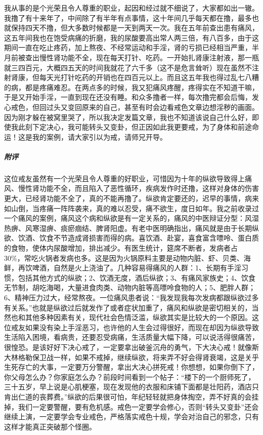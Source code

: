 \begin{case}
    我从事的是个光荣且令人尊重的职业，起因和经过就不细说了，大家都如出一辙。我撸了有十来年了，中间除了有半年有点事情，这十年间几乎每天都在撸，最多也就保持四天不撸，但大多数时候都是一天到两天一次。我在五年前查出患有痛风，这五年间我也在饱受病痛的折磨，我的尿酸要高出常人两三倍，有八百多，由于这期间一直在吃止疼药，加上熬夜、不经常运动和手淫，肾的亏损已经相当严重，半月前被查出慢性肾功能不全，现在每天打针、吃药。一开始扎肾康注射液，那一瓶就三四百元，大概四五天的时间我就花了六千多（这不是危言耸听）现在虽然不注射肾康，但每天光打针吃药的开销也在四百元以上。而且这五年我也得过乱七八糟的病，都是疼痛难忍。在两点多的时候，我又犯痛风疼醒，疼得实在不知道干嘛，于是又开始手淫，一直到现在还没有睡。和众多撸者一样，每次撸完都会后悔，发心戒色，但回过头又变回原来的自己，甚至有时会边看戒色文章边想淫秽的画面。因为刚才躲在被窝里哭了，所以我决定发篇文章，我也不知道该说自己什么好，即使我此刻下定决心，我可能转头又变卦，但正因如此我更要戒，为了身体和前途命运！这是我的案例，请大家引以为戒，请师兄开导。
    \subparagraph{附评} 这位戒友虽然有一个光荣且令人尊重的好职业，可惜因为十年的纵欲导致得上痛风、慢性肾功能不全，而且陷入了恶性循环，疾病发作时还撸，这样对身体的伤害更大，已经肾功能不全了，真的不能再撸了。纵欲肯定要还的，迟早的事情，病来如山倒，当疼痛一阵阵袭来，真的难以忍受，痛不欲生，度日如年。我之前收录过一个痛风的案例，痛风这个病和纵欲是有一定关系的，痛风的中医辩证分型：风湿热痹、风寒湿痹、痰瘀痼结、脾肾阳虚。有老中医明确指出，痛风就是由于长期纵欲、饮酒、饮食不节造成肾损害而得的病。喜饮酒、赴宴，喜食富含嘌呤、蛋白质的食物，使体内尿酸增加，排出减少。有医生统计，筵席不断者，发病者占 30\%，常吃火锅者发病也多。这是因为火锅原料主要是动物内脏、虾、贝类、海鲜，再饮啤酒，自然是火上浇油了。几种容易得痛风的人群：1、长期有手淫习惯，包括其他方式的纵欲；2、饮酒无度，酒后纵欲；3、有痛风家族史；4、饮食无节制，胡吃海喝，大量进食肉类、动物内脏等高嘌呤食物的人；5、肥胖人群；6、精神压力过大，经常熬夜。一位痛风患者说：“我发现我每次发病都跟纵欲过多有关系。”也就是纵欲过后就发作了或者症状加重了，痛风和纵欲是密切相关的，当然也和其他多种因素有关，现代社会色情泛滥，纵欲其实是比较大的一个原因。这位戒友如果没有染上手淫恶习，也许他的人生会过得很好，而现在却因为纵欲导致生活陷入困境，看病贵，还要忍受病痛，生活质量大幅下降，可以说活得很痛苦，很惶恐。是该好好下决心戒了，一定要拿出破釜沉舟的勇气，下大决心戒！就像斯大林格勒保卫战一样，如果不戒掉，继续纵欲，将来弄不好会得肾衰竭，这是关乎生死存亡的大事，一定要万分警醒，拿出大决心拼死戒！你想想，如果你倒下了，你父母怎么办？你家庭怎么办？前段时间看到一个帖子：“楼下的一个厨师死了，三十五岁，早上说是心肌梗塞，现在发现他的衣服和床铺下面都是壮阳药，酒店只肯出仁道的丧葬费。”纵欲的后果很可怕，年纪轻轻就把身体掏空，弄不好真的会挂掉，我们一定要警醒，要有危机感。戒色一定要学会修心，否则“转头又变卦”还会继续上演，一定要学会专业戒色，严格落实戒色十规，学会对治自己的邪念，只有这样才能真正突破那个怪圈。
\end{case}

